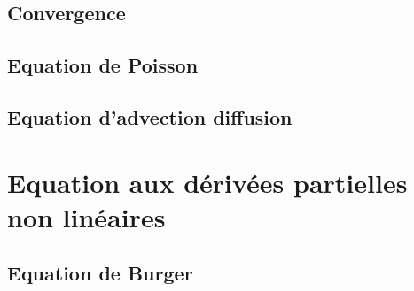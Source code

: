 \documentclass[a4paper,12pt]{article}
\begin{document}
\subsection{Convergence}

\subsection{Equation de Poisson}

\subsection{Equation d'advection diffusion}

\section{Equation aux dérivées partielles non linéaires}

\subsection{Equation de Burger}
\end{document}
